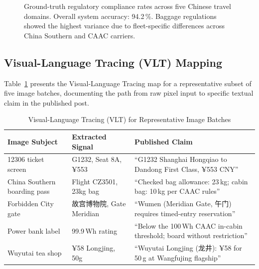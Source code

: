 \documentclass[conference]{IEEEtran}
\begin{document}
\begin{figure}[!t]
\centering
{}
\caption{Ground-truth regulatory compliance rates across five Chinese travel
domains. Overall system accuracy: 94.2\,\%. Baggage regulations showed the
highest variance due to fleet-specific differences across China Southern and
CAAC carriers.}
\label{fig:compliance}
\end{figure}

\subsection{Visual-Language Tracing (VLT) Mapping}

Table~\ref{tab:vlt} presents the Visual-Language Tracing map for a representative
subset of five image batches, documenting the path from raw pixel input to
specific textual claim in the published post.

\begin{table}[!t]
\caption{Visual-Language Tracing (VLT) for Representative Image Batches}
\label{tab:vlt}
\renewcommand{\arraystretch}{1.2}
\centering
\begin{tabular}{p{1.4cm}p{2.5cm}p{3.6cm}}
\toprule
\textbf{Image Subject} & \textbf{Extracted Signal} & \textbf{Published Claim} \\
\midrule
12306 ticket screen &
G1232, Seat 8A, ¥553 &
``G1232 Shanghai Hongqiao to Dandong First Class, ¥553 CNY'' \\
\midrule
China Southern boarding pass &
Flight CZ3501, 23kg bag &
``Checked bag allowance: 23\,kg; cabin bag: 10\,kg per CAAC rules'' \\
\midrule
Forbidden City gate &
故宫博物院, Gate Meridian &
``Wumen (Meridian Gate, 午门) requires timed-entry reservation'' \\
\midrule
Power bank label &
99.9\,Wh rating &
``Below the 100\,Wh CAAC in-cabin threshold; board without restriction'' \\
\midrule
Wuyutai tea shop &
¥58 Longjing, 50g &
``Wuyutai Longjing (龙井): ¥58 for 50\,g at Wangfujing flagship'' \\
\bottomrule
\end{tabular}
\end{table}
\end{document}

